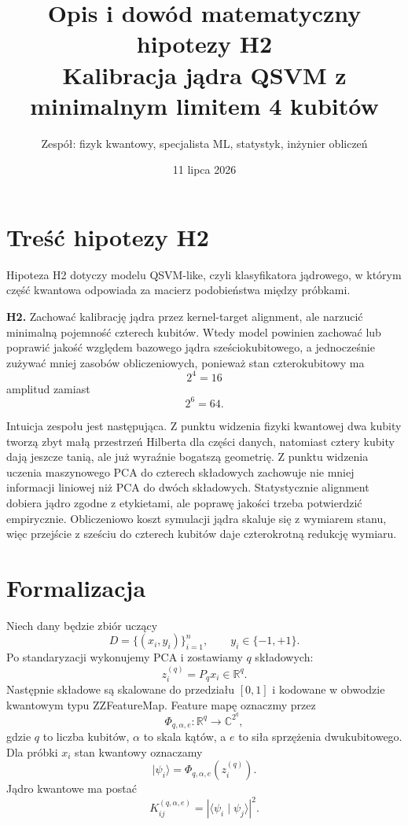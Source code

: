 \documentclass[11pt,a4paper]{article}
\title{Opis i dowód matematyczny hipotezy H2\\
\large Kalibracja jądra QSVM z minimalnym limitem 4 kubitów}
\author{Zespół: fizyk kwantowy, specjalista ML, statystyk, inżynier obliczeń}
\date{11 lipca 2026}
\begin{document}
\maketitle

\section{Treść hipotezy H2}

Hipoteza H2 dotyczy modelu QSVM-like, czyli klasyfikatora jądrowego, w którym część kwantowa odpowiada za macierz podobieństwa między próbkami.

\medskip
\noindent
\textbf{H2.} Zachować kalibrację jądra przez kernel-target alignment, ale narzucić minimalną pojemność czterech kubitów. Wtedy model powinien zachować lub poprawić jakość względem bazowego jądra sześciokubitowego, a jednocześnie zużywać mniej zasobów obliczeniowych, ponieważ stan czterokubitowy ma
\[
2^4 = 16
\]
amplitud zamiast
\[
2^6 = 64.
\]

Intuicja zespołu jest następująca. Z punktu widzenia fizyki kwantowej dwa kubity tworzą zbyt małą przestrzeń Hilberta dla części danych, natomiast cztery kubity dają jeszcze tanią, ale już wyraźnie bogatszą geometrię. Z punktu widzenia uczenia maszynowego PCA do czterech składowych zachowuje nie mniej informacji liniowej niż PCA do dwóch składowych. Statystycznie alignment dobiera jądro zgodne z etykietami, ale poprawę jakości trzeba potwierdzić empirycznie. Obliczeniowo koszt symulacji jądra skaluje się z wymiarem stanu, więc przejście z sześciu do czterech kubitów daje czterokrotną redukcję wymiaru.

\section{Formalizacja}

Niech dany będzie zbiór uczący
\[
D = \{(x_i,y_i)\}_{i=1}^{n}, \qquad y_i \in \{-1,+1\}.
\]
Po standaryzacji wykonujemy PCA i zostawiamy $q$ składowych:
\[
z_i^{(q)} = P_q x_i \in \mathbb{R}^q.
\]
Następnie składowe są skalowane do przedziału $[0,1]$ i kodowane w obwodzie kwantowym typu ZZFeatureMap. Feature mapę oznaczmy przez
\[
\Phi_{q,\alpha,e}:\mathbb{R}^q \to \mathbb{C}^{2^q},
\]
gdzie $q$ to liczba kubitów, $\alpha$ to skala kątów, a $e$ to siła sprzężenia dwukubitowego. Dla próbki $x_i$ stan kwantowy oznaczamy
\[
|\psi_i\rangle = \Phi_{q,\alpha,e}\!\left(z_i^{(q)}\right).
\]
Jądro kwantowe ma postać
\[
K_{ij}^{(q,\alpha,e)}
=
\left|\langle \psi_i \mid \psi_j \rangle\right|^2.
\]
\end{document}
